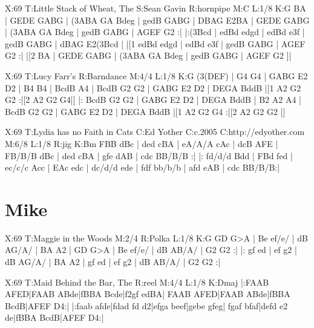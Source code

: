\documentclass{article}
\begin{document}
\begin{abc}[name]
X:69
T:Little Stack of Wheat, The
S:Sean Gavin
R:hornpipe
M:C
L:1/8
K:G
BA | GEDE GABG | (3ABA GA Bdeg | gedB GABG | DBAG E2BA |
GEDE GABG | (3ABA GA Bdeg | gedB GABG | AGEF G2 :|
|:(3Bcd | edBd edgd | edBd e3f | gedB GABG | dBAG E2(3Bcd |
|[1 edBd edgd | edBd e3f | gedB GABG | AGEF G2 :|
|[2 BA | GEDE GABG | (3ABA GA Bdeg | gedB GABG | AGEF G2 ]|
\end{abc}

\begin{abc}[name]
X:69
T:Lucy Farr's
R:Barndance
M:4/4
L:1/8
K:G
(3(DEF) | G4 G4 | GABG E2 D2 | B4 B4 | BcdB A4 |
BcdB G2 G2 | GABG E2 D2 | DEGA BddB |[1 A2 G2 G2 :|[2 A2 G2 G4|]
|: BcdB G2 G2 | GABG E2 D2 | DEGA BddB | B2 A2 A4 |
BcdB G2 G2 | GABG E2 D2 | DEGA BddB |[1 A2 G2 G4 :|[2 A2 G2 G2 |]
\end{abc}

\begin{abc}[name]
X:69
T:Lydia has no Faith in Cats
C:Ed Yother
C:c.2005
C:http://edyother.com
M:6/8
L:1/8
R:jig
K:Bm
FBB dBc | ded cBA | eA/A/A cAc | dcB AFE |
FB/B/B dBc | ded cBA | gfe dAB | cdc BB/B/B :|
|: fd/d/d Bdd | FBd fed | ec/c/c Acc | EAc edc |
dc/d/d ede | fdf bb/b/b | afd eAB | cdc BB/B/B:|
\end{abc}

\section{Mike}

\begin{abc}[name]
X:69
T:Maggie in the Woods
M:2/4
R:Polka
L:1/8
K:G
GD G>A | Be ef/e/ | dB AG/A/ | BA A2 |
GD G>A | Be ef/e/ | dB AB/A/ | G2 G2 :|
|: gf ed | ef g2 | dB AG/A/ | BA A2 |
gf ed | ef g2 | dB AB/A/ | G2 G2 :|
\end{abc}

\begin{abc}[name]
X:69
T:Maid Behind the Bar, The
R:reel
M:4/4
L:1/8
K:Dmaj
|:FAAB AFED|FAAB ABde|fBBA Bcde|f2gf edBA|
FAAB AFED|FAAB ABde|fBBA BcdB|AFEF D4:|
|:faab afde|fdad fd d2|efga beef|gebe gfeg|
fgaf bfaf|defd e2 de|fBBA BcdB|AFEF D4:|
\end{abc}
\end{document}
